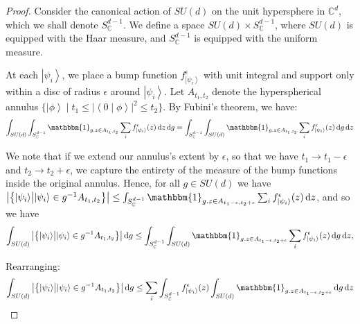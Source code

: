 \documentclass{amsart}
\theoremstyle{definition}
\newcommand{\ket}[1]{{\left\vert{#1}\right\rangle}}
\newcommand{\sprod}[2]{\left|\left< {#1} \middle| {#2} \right>\right|}
\newcommand*\dif{\mathop{}\!\mathrm{d}}
\begin{document}
\begin{proof}
Consider the canonical action of $SU(d)$ on the unit hypersphere in $\mathbb{C}^d$, which we shall denote $S_\mathbb{C}^{d-1}$. We define a space $SU(d)\times S_\mathbb{C}^{d-1}$, where $SU(d)$ is equipped with the Haar measure, and $S_\mathbb{C}^{d-1}$ is equipped with the uniform measure.

At each $\ket{\psi_i}$, we place a bump function $f^\epsilon_\ket{\psi_i}$ with unit integral and support only within a disc of radius $\epsilon$ around $\ket{\psi_i}$.
Let $A_{t_1,t_2}$ denote the hyperspherical annulus $\{\ket{\phi}\mid t_1\leq\sprod{0}{\phi}^2\leq t_2\}$. By Fubini's theorem, we have:
\begin{equation}
\int_{SU(d)} \int_{S_\mathbb{C}^{d-1}} \mathbbm{1}_{g.z\in A_{t_1,t_2}} \sum_i f^\epsilon_\ket{\psi_i}(z) \dif z \dif g = \int_{S_\mathbb{C}^{d-1}} \int_{SU(d)}  \mathbbm{1}_{g.z\in A_{t_1,t_2}} \sum_i f^\epsilon_\ket{\psi_i}(z) \dif g \dif z
\end{equation}




We note that if we extend our annulus's extent by $\epsilon$, so that we have $t_1\rightarrow t_1-\epsilon$ and $t_2\rightarrow t_2+\epsilon$, we capture the entirety of the measure of the bump functions inside the original annulus. Hence, for all $g\in SU(d)$ we have $\left|\left\{\ket{\psi_i} \middle| \ket{\psi_i} \in g^{-1}A_{t_1,t_2}\right\}\right|\leq \int_{S_\mathbb{C}^{d-1}} \mathbbm{1}_{g.z\in A_{t_1-\epsilon,t_2+\epsilon}} \sum_i f^\epsilon_\ket{\psi_i}(z) \dif z $, and so we have
\begin{equation}
\int_{SU(d)} \left|\left\{\ket{\psi_i} \middle| \ket{\psi_i} \in g^{-1}A_{t_1,t_2}\right\}\right| \dif g \leq \int_{S_\mathbb{C}^{d-1}} \int_{SU(d)}  \mathbbm{1}_{g.z\in A_{t_1-\epsilon,t_2+\epsilon}} \sum_i f^\epsilon_\ket{\psi_i}(z) \dif g \dif z,
\end{equation}

Rearranging:
\begin{equation}
\int_{SU(d)} \left|\left\{\ket{\psi_i} \middle| \ket{\psi_i} \in g^{-1}A_{t_1,t_2}\right\}\right| \dif g \leq \sum_i\int_{S_\mathbb{C}^{d-1}}f^\epsilon_\ket{\psi_i}(z)  \int_{SU(d)} \mathbbm{1}_{g.z\in A_{t_1-\epsilon,t_2+\epsilon}} \dif g \dif z \label{eqn:1} 
\end{equation}


\end{proof}
\end{document}
